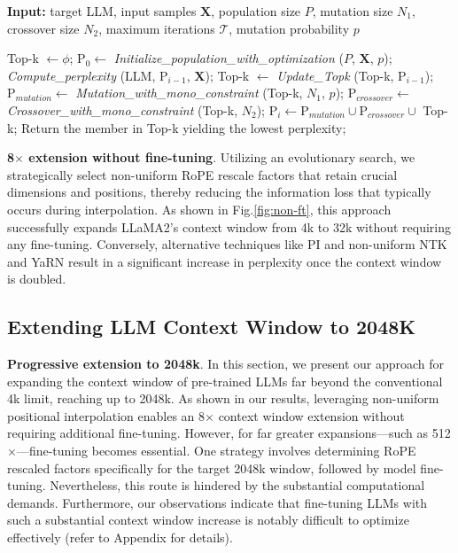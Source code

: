 \begin{algorithm}[t]
	\small
	\caption{The search algorithm}
	\textbf{Input:} target LLM, input samples $\mathbf{X}$, population size $P$, mutation size $N_1$, crossover size $N_2$, maximum iterations $\mathcal{T}$, mutation probability $p$\\

	\begin{algorithmic}[1]
		\label{alg:search}
		\STATE Top-k $\leftarrow \phi$;	
		\STATE $\text{P}_0 \leftarrow$ \textit{Initialize\_population\_with\_optimization} ($P$, $\mathbf{X}$, $p$);
		\STATE \textit{Compute\_perplexity} (LLM, $\text{P}_{i-1}$, $\mathbf{X}$);
		\STATE Top-k $\leftarrow$ \textit{Update\_Topk} (Top-k, $\text{P}_{i-1}$);
		\STATE $\text{P}_{mutation} \leftarrow$ \textit{Mutation\_with\_mono\_constraint} (Top-k, $N_1$, $p$);
		\STATE $\text{P}_{crossover} \leftarrow$ \textit{Crossover\_with\_mono\_constraint} (Top-k, $N_2$);
		\STATE $\text{P}_i \leftarrow \text{P}_{mutation} \cup \text{P}_{crossover} \cup$ Top-k;
		\ENDFOR
		\STATE Return the member in Top-k yielding the lowest perplexity;
	\end{algorithmic}
\end{algorithm}

\textbf{8$\times$ extension without fine-tuning}. Utilizing an evolutionary search, we strategically select non-uniform RoPE rescale factors that retain crucial dimensions and positions, thereby reducing the information loss that typically occurs during interpolation. As shown in Fig.\ref{fig:non-ft}, this approach successfully expands LLaMA2's context window from 4k to 32k without requiring any fine-tuning. Conversely, alternative techniques like PI and non-uniform NTK and YaRN result in a significant increase in perplexity once the context window is doubled.

\subsection{Extending LLM Context Window to 2048K}
\label{sec:extendto2048k}

\textbf{Progressive extension to 2048k}. In this section, we present our approach for expanding the context window of pre-trained LLMs far beyond the conventional 4k limit, reaching up to 2048k. As shown in our results, leveraging non-uniform positional interpolation enables an 8$\times$ context window extension without requiring additional fine-tuning. However, for far greater expansions—such as 512$\times$—fine-tuning becomes essential. One strategy involves determining RoPE rescaled factors specifically for the target 2048k window, followed by model fine-tuning. Nevertheless, this route is hindered by the substantial computational demands. Furthermore, our observations indicate that fine-tuning LLMs with such a substantial context window increase is notably difficult to optimize effectively (refer to Appendix for details).

